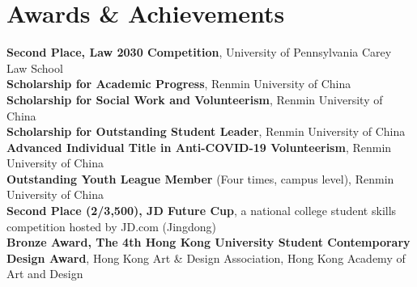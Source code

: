 \documentclass[letterpaper,11pt]{article}
\newcommand{\resumeSubHeadingListStart}{\begin{itemize}[leftmargin=0.15in, label={}]}
\newcommand{\resumeSubHeadingListEnd}{\end{itemize}}
\begin{document}
\section{Awards \& Achievements}
  \vspace{3pt}
  \resumeSubHeadingListStart
    \small{\item{
        \textbf{Second Place, Law 2030 Competition}{, University of Pennsylvania Carey Law School} \\ \vspace{3pt}
        \textbf{Scholarship for Academic Progress}{, Renmin University of China} \\ \vspace{3pt}
        \textbf{Scholarship for Social Work and Volunteerism}{, Renmin University of China} \\ \vspace{3pt}
        \textbf{Scholarship for Outstanding Student Leader}{, Renmin University of China} \\ \vspace{3pt}
        \textbf{Advanced Individual Title in Anti-COVID-19 Volunteerism}{, Renmin University of China} \\ \vspace{3pt}
        \textbf{Outstanding Youth League Member}{ (Four times,  campus level), Renmin University of China} \\ \vspace{3pt}
        \textbf{Second Place (2/3,500), JD Future Cup}{, a national college student skills competition hosted by JD.com (Jingdong)} \\ \vspace{3pt}
        \textbf{Bronze Award, The 4th Hong Kong University Student Contemporary Design Award}{, Hong Kong Art \& Design Association, Hong Kong Academy of Art and Design} \\ \vspace{3pt}

    }}
  \resumeSubHeadingListEnd

\end{document}
